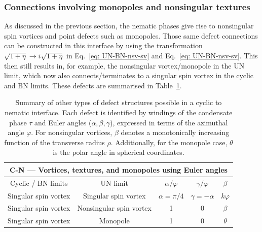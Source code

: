 \subsubsection{Connections involving monopoles and nonsingular textures}
As discussed in the previous section, the nematic phases give rise to
nonsingular spin vortices and point defects such as monopoles.
Those same defect connections can be constructed in this interface by using
the transformation \(\sqrt{1+\eta} \rightarrow i\sqrt{1+\eta}\) in
Eq.~\eqref{eq: UN-BN-nsv-sv} and Eq.~\eqref{eq: UN-BN-nsv-sv}.
This then still results in, for example, the nonsingular vortex/monopole in the
UN limit, which now also connects/terminates to a singular spin vortex in the
cyclic and BN limits.
These defects are summarised in Table~\ref{tab: C-N-other}.
\begin{table}
    \centering
    \begin{tabular}{ccccc}
        \toprule
        \multicolumn{5}{c}{C-N --- Vortices, textures, and monopoles using Euler
            angles} \\
        \midrule
        Cyclic / BN limits & UN limit & \(\alpha/\varphi \)
        & \(\gamma/\varphi \) & \(\beta \) \\
        \midrule
        Singular spin vortex & Singular spin vortex & \(\alpha=\pi/4\)
            & \(\gamma=-\alpha\) & \(k\varphi\) \\
        Singular spin vortex & Nonsingular spin vortex & 1 & 0
            & \(\beta\) \\
        Singular spin vortex & Monopole & 1 & 0 & \(\theta\) \\
        \bottomrule
    \end{tabular}
    \caption[Examples of monopole and nonsingular vortex connections across a
    cyclic to nematic interface]{\label{tab: C-N-other}Summary of other types of
    defect structures possible in a cyclic to nematic interface.
    Each defect is identified by windings of the condensate phase \(\tau \) and
    Euler angles (\(\alpha, \beta, \gamma \)), expressed in terms of the
    azimuthal angle \(\varphi \).
    For nonsingular vortices, \(\beta\) denotes a monotonically increasing
    function of the transverse radius \(\rho \).
    Additionally, for the monopole case, \(\theta \) is the polar angle in
    spherical coordinates.}
\end{table}

